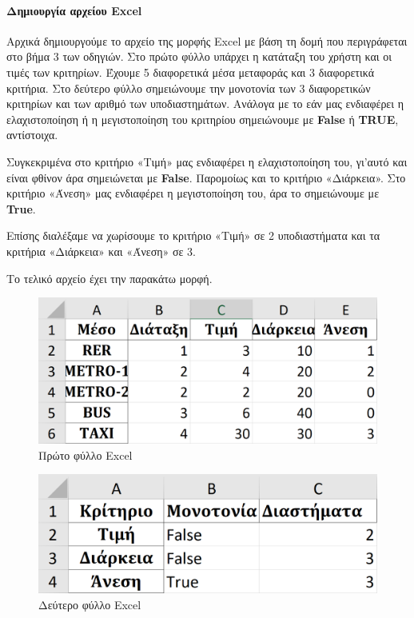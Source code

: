 \documentclass[11pt,a4paper,titlepage]{article}
\numberwithin{equation}{section}
\begin{document}
\paragraph{Δημιουργία αρχείου Excel}
Αρχικά δημιουργούμε το αρχείο της μορφής Excel με βάση τη δομή που περιγράφεται στο βήμα 3 των οδηγιών. Στο πρώτο φύλλο υπάρχει η κατάταξη του χρήστη και οι τιμές των κριτηρίων. Έχουμε 5 διαφορετικά μέσα μεταφοράς και 3 διαφορετικά κριτήρια. Στο δεύτερο φύλλο σημειώνουμε την μονοτονία των 3 διαφορετικών κριτηρίων και των αριθμό των υποδιαστημάτων. Ανάλογα με το εάν μας ενδιαφέρει η ελαχιστοποίηση ή η μεγιστοποίηση του κριτηρίου σημειώνουμε με \textbf{False} ή \textbf{TRUE}, αντίστοιχα.

Συγκεκριμένα στο κριτήριο «Τιμή» μας ενδιαφέρει η ελαχιστοποίηση του, γι'αυτό και είναι φθίνον άρα σημειώνεται με \textbf{False}. Παρομοίως και το κριτήριο «Διάρκεια». Στο κριτήριο «Άνεση» μας ενδιαφέρει η μεγιστοποίηση του, άρα το σημειώνουμε με \textbf{True}. 

Επίσης διαλέξαμε να χωρίσουμε το κριτήριο «Τιμή» σε 2 υποδιαστήματα και τα κριτήρια «Διάρκεια» και «Άνεση» σε 3.

Το τελικό αρχείο έχει την παρακάτω μορφή.

\begin{figure}[H]
	\centering
	\includegraphics[width=0.7\linewidth]{media/excel_sheet_1.png}
	\caption{Πρώτο φύλλο Excel}
	\label{fig:excel_sheet_1}
\end{figure}

\begin{figure}[H]
	\centering
	\includegraphics[width=0.7\linewidth]{media/excel_sheet_2.png}
	\caption{Δεύτερο φύλλο Excel}
	\label{fig:excel_sheet_2}
\end{figure}
\end{document}
